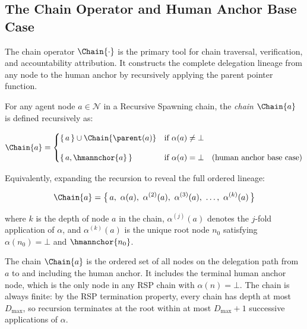 \subsection{The Chain Operator and Human Anchor Base Case}
\label{sec:chain-operator}

The chain operator $\Chain{\cdot}$ is the primary tool for chain traversal, verification, and accountability attribution. It constructs the complete delegation lineage from any node to the human anchor by recursively applying the parent pointer function.

\begin{dfn}
\label{def:chain-operator}
For any agent node $a \in \mathcal{N}$ in a Recursive Spawning chain, the \emph{chain} $\Chain{a}$ is defined recursively as:

\begin{equation}
\Chain{a} =
\begin{cases}
\{\,a\,\} \cup \Chain{\parent(a)} & \text{if } \alpha(a) \neq \bot \\[10pt]
\{\,a,\hmannchor{a}\,\} & \text{if } \alpha(a) = \bot \quad \text{(human anchor base case)}
\end{cases}
\label{eq:chain-recursive}
\end{equation}

Equivalently, expanding the recursion to reveal the full ordered lineage:

\begin{equation}
\Chain{a} = \bigl\{\, a,\ \alpha(a),\ \alpha^{(2)}(a),\ \alpha^{(3)}(a),\ \ldots,\ \alpha^{(k)}(a) \,\bigr\}
\label{eq:chain-expanded}
\end{equation}

where $k$ is the depth of node $a$ in the chain, $\alpha^{(j)}(a)$ denotes the $j$-fold application of $\alpha$, and $\alpha^{(k)}(a)$ is the unique root node $n_0$ satisfying $\alpha(n_0) = \bot$ and $\hmannchor{n_0}$.
\end{dfn}

The chain $\Chain{a}$ is the ordered set of all nodes on the delegation path from $a$ to and including the human anchor. It includes the terminal human anchor node, which is the only node in any RSP chain with $\alpha(n) = \bot$. The chain is always finite: by the RSP termination property, every chain has depth at most $D_{\max}$, so recursion terminates at the root within at most $D_{\max} + 1$ successive applications of $\alpha$.

